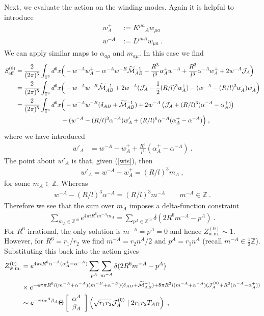 \documentclass[11pt]{article}
\numberwithin{equation}{section}
\begin{document}
Next, we  evaluate the action on the winding modes. Again it is helpful to introduce
\begin{align}
w^+_A  
& := K^{\mu a}{}_Aw_{\mu a}\nonumber\\
w^{-A} 
& := L^{\mu a A}w_{\mu a}	\ .
\end{align}
We can apply similar maps to $\alpha_{a\mu  }$ and $m_{a \mu  }$. 
In this case we find
\begin{align}
S^{(0)}_{\text{eff} }=  \frac{2}{(2\pi)^5} \int_{{\mathbb T}^6} d^6x &\Big(  -w^{-A}w^+_A -   w^{-A}w^{-B}\widetilde{\cal M}^{-1}_{AB}    -\frac{R^3}{l^3}\alpha^{+}_{A}w^{-A} +\frac{R^3}{l^3}\alpha^{-A}w^+_A+2w^{-A}{\cal J}_{A} \Big)\nonumber\\
= \frac{2}{(2\pi)^5} \int_{{\mathbb T}^6} d^6x &\Big(  -  w^{-A}w^{-B}\widetilde{\cal M}^{-1}_{AB}  +2w^{-A}({\cal J}_{A}-\frac12(R/l)^3\alpha^+_A)   -(w^{-A}- (R/l)^3\alpha^-_A)w^+_A \Big)\nonumber\\
= \frac{2}{(2\pi)^5} \int_{{\mathbb T}^6} d^6x &\Big(- w^{-A} w^{-B}(\delta_{AB}+\widetilde{\cal M}^{-1}_{AB})  +2 w^{-A}\left({\cal J}_{A}+(R/l)^3( \alpha^{-A}-\alpha^{+}_{A})\right) \nonumber\\
& +( w^{-A}- (R/l)^3 \alpha^{-A}) w'_A    +(R/l)^6\alpha^{-A}(\alpha^+_A-\alpha^{-A})\Big)\;,
\end{align}
where we have introduced
\begin{align}
 w'_A &= w^{-A}-w^+_A +\frac{R^3}{l^3}(\alpha^+_A-\alpha^{-A})\ .
\end{align} 
The point about   $w'_A$ is that, given (\ref{wis}),   then 
\begin{align}
w'_A = w^{-A}-w^+_{A} =  (R/l)^3m_A\ ,
\end{align}
for some $m_A\in  {\mathbb Z} $.
Whereas
\begin{align}
 w^{-A}- (R/l)^3 \alpha^{-A} =  (R/l)^3m^{-A}\qquad m^{-A}\in  {\mathbb Z}\ .
\end{align}
Therefore we see that the sum over $m_A$ imposes a delta-function constraint
\begin{align}
\sum_{m_A\in {\mathbb Z}^{10}} e^{4\pi i R^6  m^{-A}m_A}	=   \sum_{p^A\in {\mathbb Z}^{10}}\delta(2R^6 m^{-A}-p^A)\ .
\end{align}
For $R^6$ irrational, the only solution is $ m^{-A}=p^A=0$
and hence $Z^{(0)}_{\text{w.m.}}\sim 1$. However, for $R^6=r_1/r_2$ we find  
$m^{-A} = r_2 n^A/2$ and $p^A=r_1n^A$ (recall $m^{-A}\in \frac 12 \mathbb Z$). Substituting this back into the action gives 
\begin{align}
Z^{(0)}_{\text{w.m.}} & =  e^{4 \pi i R^6 \alpha^{-A}(\alpha^+_A-\alpha^{-A})}\sum_{p^A}\sum_{m^{-A}}\delta(2R^6m^{-A}-p^A)\nonumber\\
& 
\times e^{-4\pi \pi R^6 i (m^{-A}+\alpha^{-A})(m^{-B}+\alpha^{-B})(\delta_{AB}+\widetilde{\cal M}^{-1}_{AB}) + 8\pi R^3 i (m^{-A}+\alpha^{-A})( {\cal J}_A^{(0)}+R^3( \alpha^{-A}-\alpha^{+}_{A}))}
\nonumber\\
& \sim    e^{-\pi i \alpha^A\beta_A}\Theta \left[\begin{array}{c}
\alpha^A \\ \beta_A 	
\end{array}\right]
\left(\sqrt{r_1r_2} {\cal J}^{(0)}_{A}\mid 2r_1r_2{ T}_{AB} \right)
\;,
\end{align}
\end{document}
